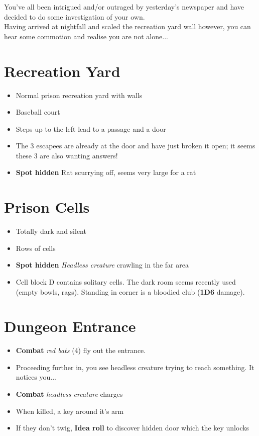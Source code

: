 \documentclass[12pt,a4paper]{article}
\begin{document}
You've all been intrigued and/or outraged by yesterday's newspaper and have decided to do some investigation of your own.\\
Having arrived at nightfall and scaled the recreation yard wall however, you can hear some commotion and realise you are not alone...
\section*{Recreation Yard}
\begin{itemize}
\item{Normal prison recreation yard with walls}
\item{Baseball court}
\item{Steps up to the left lead to a passage and a door}
\item{The 3 escapees are already at the door and have just broken it open; it seems these 3 are also wanting answers!}
\item{\textbf{Spot hidden} Rat scurrying off, seems very large for a rat}
\end{itemize}
\section*{Prison Cells}
\begin{itemize}
\item{Totally dark and silent}
\item{Rows of cells}
\item{\textbf{Spot hidden} \textit{Headless creature} crawling in the far area}
\item{Cell block D contains solitary cells.  The dark room seems recently used (empty bowls, rags).  Standing in corner is a bloodied club (\textbf{1D6} damage).}
\end{itemize}
\section*{Dungeon Entrance}
\begin{itemize}
\item{\textbf{Combat} \textit{red bats} (4) fly out the entrance.}
\item{Proceeding further in, you see headless creature trying to reach something.  It notices you...}
\item{\textbf{Combat} \textit{headless creature} charges}
\item{When killed, a key around it's arm}
\item{If they don't twig, \textbf{Idea roll} to discover hidden door which the key unlocks}
\end{itemize}
\newpage
\end{document}
